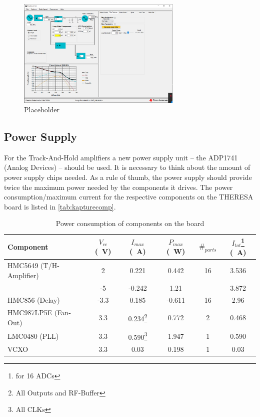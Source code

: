 \begin{figure}[H]
	\centering
	\includegraphics[width = 0.7\textwidth]{chap/03-work/img/pll.png}
	\caption{Placeholder}
	\label{fig:pll}
\end{figure}



\subsection{Power Supply}
For the Track-And-Hold amplifiers a new power supply unit -- the ADP1741 (Analog Devices) -- should be used. It is necessary to think about the amount of power supply chips needed. As a rule of thumb, the power supply should provide twice the maximum power needed by the components it drives. The power consumption/maximum current for the respective components on the THERESA board is listed in \autoref{tab:kapturecomp}. 
\begin{table}[tbh!]
	\caption{Power consumption of components on the board}
	\label{tab:kapturecomp}
	\begin{minipage}{\textwidth}
		\centering
		\begin{tabularx}{\textwidth}{XSSSSS}
			\toprule
			\textbf{Component} & \textbf{$V_{cc}$ (\SI{}{\volt})} & \textbf{$I_{max}$ (\SI{}{\ampere})} & \textbf{$P_{max}$ (\SI{}{\watt})} & $\#_{parts}$ & \textbf{$I_{tot}$}\footnote{for 16 ADCs} (\SI{}{\ampere})\\
				\midrule
			HMC5649 (T/H-Amplifier) 	& 2	  	& 0.221 	 & 0.442 & 16 & 3.536\\
									& -5  	& -0.242 & 1.21 &  & 3.872\\
			HMC856 (Delay) 			& -3.3	& 0.185 & -0.611 & 16 & 2.96\\
			HMC987LP5E (Fan-Out) 	& 3.3 	& 0.234\footnote{All Outputs and RF-Buffer} & 0.772 & 2 & 0.468\\
			LMC0480 (PLL) 			& 3.3 	& 0.590\footnote{All CLKs} & 1.947 & 1 & 0.590\\
			VCXO 					& 3.3 	& 0.03 & 0.198 & 1 & 0.03\\
			\bottomrule
		\end{tabularx}
	\end{minipage}
\end{table}

